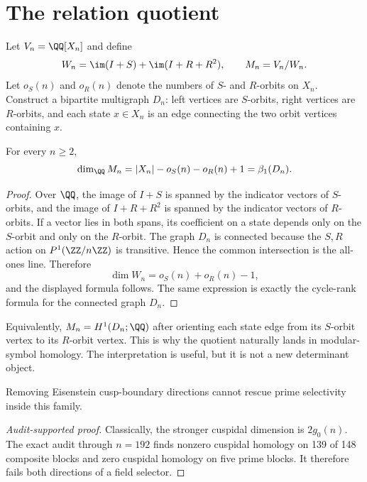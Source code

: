 \section{The relation quotient}
\label{sec:relation}

Let $V_n=\QQ[X_n]$ and define
\[
  W_n=\im(I+S)+\im(I+R+R^2),\qquad M_n=V_n/W_n .
\]
Let $o_S(n)$ and $o_R(n)$ denote the numbers of $S$- and $R$-orbits on $X_n$.
Construct a bipartite multigraph $D_n$: left vertices are $S$-orbits, right
vertices are $R$-orbits, and each state $x\in X_n$ is an edge connecting the
two orbit vertices containing $x$.

\begin{theorem}
\label{thm:rank}
For every $n\ge2$,
\[
  \dim_\QQ M_n=|X_n|-o_S(n)-o_R(n)+1=\beta_1(D_n).
\]
\end{theorem}

\begin{proof}
Over $\QQ$, the image of $I+S$ is spanned by the indicator vectors of
$S$-orbits, and the image of $I+R+R^2$ is spanned by the indicator vectors of
$R$-orbits.  If a vector lies in both spans, its coefficient on a state depends
only on the $S$-orbit and only on the $R$-orbit.  The graph $D_n$ is connected
because the $S,R$ action on $P^1(\ZZ/n\ZZ)$ is transitive.  Hence the common
intersection is the all-ones line.  Therefore
\[
  \dim W_n=o_S(n)+o_R(n)-1,
\]
and the displayed formula follows.  The same expression is exactly the
cycle-rank formula for the connected graph $D_n$.
\end{proof}

\begin{remark}
Equivalently, $M_n=H^1(D_n;\QQ)$ after orienting each state edge from its
$S$-orbit vertex to its $R$-orbit vertex.  This is why the quotient naturally
lands in modular-symbol homology.  The interpretation is useful, but it is not
a new determinant object.
\end{remark}

\begin{corollary}
\label{cor:cuspidal}
Removing Eisenstein cusp-boundary directions cannot rescue prime selectivity
inside this family.
\end{corollary}

\begin{proof}[Audit-supported proof]
Classically, the stronger cuspidal dimension is $2g_0(n)$.  The exact audit
through $n=192$ finds nonzero cuspidal homology on 139 of 148 composite blocks
and zero cuspidal homology on five prime blocks.  It therefore fails both
directions of a field selector.
\end{proof}
